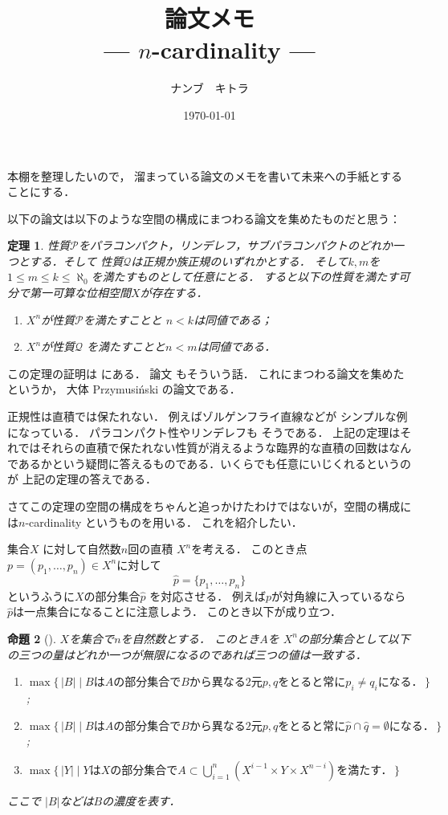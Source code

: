 \documentclass[leqno, a4paper, 12pt]{jsarticle}
\title{論文メモ
\large{\\--- $n$-cardinality ---}
}
\author{ナンブ　キトラ}
\date{\today}
\newtheorem{thm}{定理}
\newtheorem{prop}[thm]{命題}
\begin{document}
\maketitle

本棚を整理したいので，
溜まっている論文のメモを書いて未来への手紙とすることにする．


以下の論文は以下のような空間の構成にまつわる論文を集めたものだと思う：
\begin{thm}
性質$\mathcal{P}$をパラコンパクト，リンデレフ，サブパラコンパクトのどれか一つとする．そして
性質$\mathcal{Q}$は正規か族正規のいずれかとする．
そして$k, m$を$1\le m\le k\le \aleph_{0}$を満たすものとして任意にとる．
すると以下の性質を満たす可分で第一可算な位相空間$X$が存在する．
\begin{enumerate}[label=\textup{(\arabic*)}]
\item 
$X^{n}$が性質$\mathcal{P}$を満たすことと
$n<k$は同値である；

\item 
$X^{n}$が性質$\mathcal{Q}$
を満たすことと$n<m$は同値である．
\end{enumerate}
\end{thm}
この定理の証明は
\cite{MR0561584}
にある．
論文
\cite{MR0540608}
もそういう話．
これにまつわる論文を集めたというか，
大体
Przymusi\'{n}ski
の論文である．

正規性は直積では保たれない．
例えばゾルゲンフライ直線などが
シンプルな例になっている．
パラコンパクト性やリンデレフも
そうである．
上記の定理はそれではそれらの直積で保たれない性質が消えるような臨界的な直積の回数はなんであるかという疑問に答えるものである．いくらでも任意にいじくれるというのが
上記の定理の答えである．

さてこの定理の空間の構成をちゃんと追っかけたわけではないが，空間の構成には$n$-cardinality 
というものを用いる．
これを紹介したい．

集合$X$
に対して自然数$n$回の直積
$X^{n}$を考える．
このとき点
$p=(p_{1}, \dots, p_{n})\in X^{n}$に対して
\[
\hat{p}=\{p_{1}, \dots, p_{n}\}
\]
というふうに$X$の部分集合$\hat{p}$
を対応させる．
例えば$p$が対角線に入っているなら
$\hat{p}$は一点集合になることに注意しよう．
このとき以下が成り立つ．
\begin{prop}[\cite{MR0491191}]
$X$を集合で$n$を自然数とする．
このとき$A$を
$X^{n}$の部分集合として以下の三つの量はどれか一つが無限になるのであれば三つの値は一致する．
\begin{enumerate}[label=\textup{(\arabic*)}]
\item 
$\max\{\, |B|\mid \text{$B$は$A$の部分集合で$B$から異なる2元$p, q$をとると常に$p_{i}\neq q_{i}$になる．}\,\}$; 


\item 
$\max\{\, |B|\mid \text{$B$は$A$の部分集合で$B$から異なる2元$p, q$をとると常に$\hat{p}\cap \hat{q}=\emptyset$になる．} \, \}$; 
\item 
$\max\{\, |Y|\mid 
\text{$Y$は$X$の部分集合で$A\subset \bigcup_{i=1}^{n}(X^{i-1}\times Y\times X^{n-i})$を満たす．}\, \}$

\end{enumerate}
ここで
$|B|$などは$B$の濃度を表す．
\end{prop}
\end{document}
